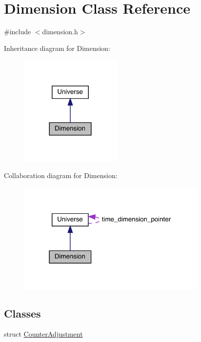 \hypertarget{class_dimension}{}\section{Dimension Class Reference}
\label{class_dimension}


{\ttfamily \#include $<$dimension.\+h$>$}



Inheritance diagram for Dimension\+:\nopagebreak
\begin{figure}[H]
\begin{center}
\leavevmode
\includegraphics[width=144pt]{class_dimension__inherit__graph}
\end{center}
\end{figure}


Collaboration diagram for Dimension\+:
\nopagebreak
\begin{figure}[H]
\begin{center}
\leavevmode
\includegraphics[width=267pt]{class_dimension__coll__graph}
\end{center}
\end{figure}
\subsection*{Classes}
\begin{DoxyCompactItemize}
\item 
struct \hyperlink{struct_dimension_1_1_counter_adjustment}{Counter\+Adjustment}
\end{DoxyCompactItemize}
